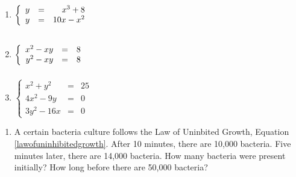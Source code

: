 \documentclass{ximera}
\begin{document}
\begin{multicols}{3}
\begin{enumerate}
\setcounter{enumi}{\value{HW}}

\item $\left\{\begin{array}{rcr}  y & = & x^{3} + 8 \\ y & = & 10x - x^{2} \\ \end{array} \right. \vphantom{\left\{\begin{array}{rcr}  x^{2} + y^{2} & = & 25 \\ 4x^{2} - 9y & = & 0 \\ 3y^{2} - 16x & = & 0\end{array} \right.}$

\item $\left\{\begin{array}{rcr}  x^2 - xy & = & 8 \\  y^2 - xy & = & 8 \\ \end{array} \right. \vphantom{\left\{\begin{array}{rcr}  x^{2} + y^{2} & = & 25 \\ 4x^{2} - 9y & = & 0 \\ 3y^{2} - 16x & = & 0\end{array} \right.}$

\item $\left\{\begin{array}{rcr}  x^{2} + y^{2} & = & 25 \\ 4x^{2} - 9y & = & 0 \\ 3y^{2} - 16x & = & 0\end{array} \right.$ \label{solveninlin2last}

\setcounter{HW}{\value{enumi}}
\end{enumerate}
\end{multicols}

\begin{enumerate}
\setcounter{enumi}{\value{HW}}

\item  A certain bacteria culture follows the Law of Uninbited Growth, Equation \ref{lawofuninhibitedgrowth}.  After 10 minutes, there are 10,000 bacteria. Five minutes later, there are 14,000 bacteria.  How many bacteria were present initially?  How long before there are 50,000 bacteria?


\setcounter{HW}{\value{enumi}}
\end{enumerate}
\end{document}
